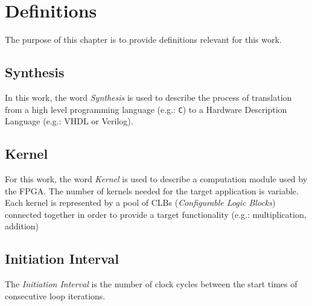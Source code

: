 \chapter{Definitions}

The purpose of this chapter is to provide definitions relevant for this work.

\section{Synthesis}
In this work, the word \emph{Synthesis} is used to describe the process of translation from
a high level programming language (e.g.: \texttt{C}) to a Hardware Description Language (e.g.:
VHDL or Verilog).

\section{Kernel}
For this work, the word \emph{Kernel} is used to describe a computation module used by
the FPGA. The number of kernels needed for the target application is variable. Each kernel is represented
by a pool of CLBs (\emph{Configurable Logic Blocks}) connected together
in order to provide a target functionality (e.g.: multiplication, addition)

\section{Initiation Interval}
The \emph{Initiation Interval} is the number of clock cycles between the start times of consecutive loop iterations.
